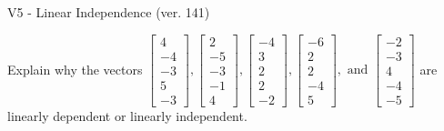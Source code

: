 \begin{exercise}
  \begin{exerciseTitle}V5 - Linear Independence (ver. 141)\end{exerciseTitle}
  \begin{exerciseStatement}
    Explain why the vectors \(\left[\begin{array}{r}
4 \\
-4 \\
-3 \\
5 \\
-3
\end{array}\right] , \left[\begin{array}{r}
2 \\
-5 \\
-3 \\
-1 \\
4
\end{array}\right] , \left[\begin{array}{r}
-4 \\
3 \\
2 \\
2 \\
-2
\end{array}\right] , \left[\begin{array}{r}
-6 \\
2 \\
2 \\
-4 \\
5
\end{array}\right] , \text{ and } \left[\begin{array}{r}
-2 \\
-3 \\
4 \\
-4 \\
-5
\end{array}\right]\) are linearly dependent or linearly independent.	



\end{exerciseStatement}
\end{exercise}
